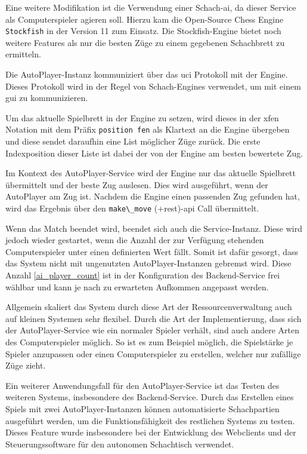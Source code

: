 Eine weitere Modifikation ist die Verwendung einer Schach-\gls{ai}, da
dieser Service als Computerspieler agieren soll. Hierzu kam die
Open-Source Chess Engine
\passthrough{\lstinline!Stockfish!}\cite{stockfish} in der Version
11 zum Einsatz. Die Stockfish-Engine bietet noch weitere Features als
nur die besten Züge zu einem gegebenen Schachbrett zu ermitteln.

Die AutoPlayer-Instanz kommuniziert über das \gls{uci}
Protokoll\cite{uciprotocol} mit der Engine. Dieses Protokoll wird in
der Regel von Schach-Engines verwendet, um mit einem \gls{gui} zu
kommunizieren.

Um das aktuelle Spielbrett in der Engine zu setzen, wird dieses in der
\gls{xfen} Notation mit dem Präfix
\passthrough{\lstinline!position fen!} als Klartext an die Engine
übergeben und diese sendet daraufhin eine List möglicher Züge zurück.
Die erste Indexposition dieser Liste ist dabei der von der Engine am
besten bewertete Zug.

Im Kontext des AutoPlayer-Service wird der Engine nur das aktuelle
Spielbrett übermittelt und der beste Zug auslesen. Dies wird ausgeführt,
wenn der AutoPlayer am Zug ist. Nachdem die Engine einen passenden Zug
gefunden hat, wird das Ergebnis über den
\passthrough{\lstinline!make\_move!} (+rest)-\gls{api} Call übermittelt.

Wenn das Match beendet wird, beendet sich auch die Service-Instanz.
Diese wird jedoch wieder gestartet, wenn die Anzahl der zur Verfügung
stehenden Computerspieler unter einen definierten Wert fällt. Somit ist
dafür gesorgt, dass das System nicht mit ungenutzten
AutoPlayer-Instanzen gebremst wird. Diese Anzahl \ref{ai_player_count}
ist in der Konfiguration des Backend-Service frei wählbar und kann je
nach zu erwarteten Aufkommen angepasst werden.

Allgemein skaliert das System durch diese Art der Ressourcenverwaltung
auch auf kleinen Systemen sehr flexibel. Durch die Art der
Implementierung, dass sich der AutoPlayer-Service wie ein normaler
Spieler verhält, sind auch andere Arten des Computerspieler möglich. So
ist es zum Beispiel möglich, die Spielstärke je Spieler anzupassen oder
einen Computerspieler zu erstellen, welcher nur zufällige Züge zieht.

Ein weiterer Anwendungsfall für den AutoPlayer-Service ist das Testen
des weiteren Systems, insbesondere des Backend-Service. Durch das
Erstellen eines Spiels mit zwei AutoPlayer-Instanzen können
automatisierte Schachpartien ausgeführt werden, um die
Funktionsfähigkeit des restlichen Systems zu testen. Dieses Feature
wurde insbesondere bei der Entwicklung des Webclients und der
Steuerungssoftware für den autonomen Schachtisch verwendet.

